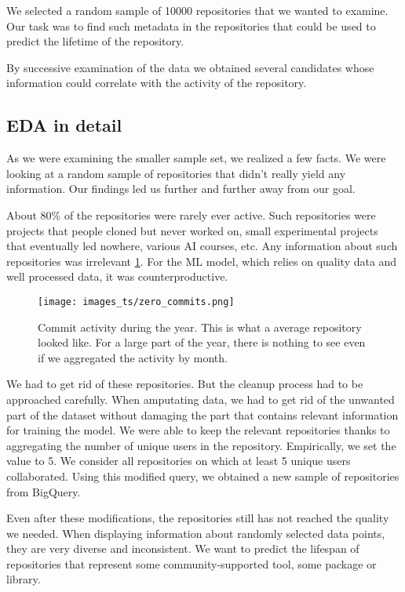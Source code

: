 \documentclass[thesis=M,english]{FITthesis}[2019/12/23]
\begin{document}
We selected a random sample of 10000 repositories that we wanted to examine. Our task was to find such metadata in the repositories that could be used to predict the lifetime of the repository. 

By successive examination of the data we obtained several candidates whose information could correlate with the activity of the repository. 

\subsection{EDA in detail}
As we were examining the smaller sample set, we realized a few facts. We were looking at a random sample of repositories that didn't really yield any information. Our findings led us further and further away from our goal.   

About 80\% of the repositories were rarely ever active. Such repositories were projects that people cloned but never worked on, small experimental projects that eventually led nowhere, various AI courses, etc. Any information about such repositories was irrelevant \ref{fig:zero_commits}. For the ML model, which relies on quality data and well processed data, it was counterproductive.

\begin{figure}[ht!]
    \centering
    \texttt{[image: images\_ts/zero\_commits.png]}
    \caption{Commit activity during the year. This is what a average repository looked like. For a large part of the year, there is nothing to see even if we aggregated the activity by month.} 
    \label{fig:zero_commits}
\end{figure}

We had to get rid of these repositories. But the cleanup process had to be approached carefully. When amputating data, we had to get rid of the unwanted part of the dataset without damaging the part that contains relevant information for training the model. We were able to keep the relevant repositories thanks to aggregating the number of unique users in the repository. Empirically, we set the value to 5. We consider all repositories on which at least 5 unique users collaborated. Using this modified query, we obtained a new sample of repositories from BigQuery.

Even after these modifications, the repositories still has not reached the quality we needed. When displaying information about randomly selected data points, they are very diverse and inconsistent. We want to predict the lifespan of repositories that represent some community-supported tool, some package or library. 
\end{document}
